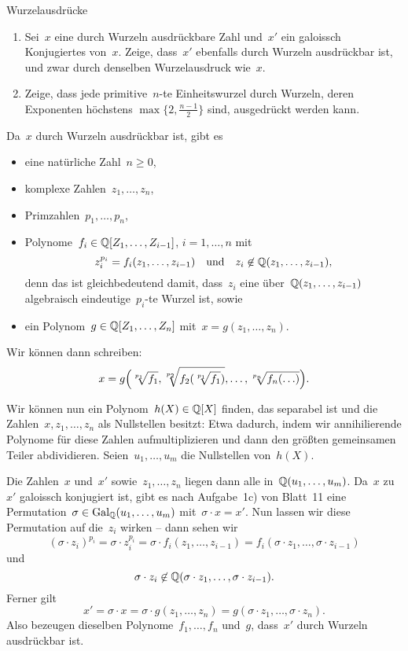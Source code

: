 \documentclass{algblatt}
\begin{document}
\begin{aufgabe}{Wurzelausdrücke}
\begin{enumerate}
\item Sei~$x$ eine durch Wurzeln ausdrückbare Zahl und~$x'$ ein galoissch
Konjugiertes von~$x$. Zeige, dass~$x'$
ebenfalls durch Wurzeln ausdrückbar ist, und zwar durch
denselben Wurzelausdruck wie~$x$.
\item Zeige, dass jede primitive~$n$-te Einheitswurzel durch Wurzeln, deren
Exponenten höchstens $\max\{ 2, \frac{n-1}{2}
\}$ sind, ausgedrückt werden kann.
\end{enumerate}

\begin{loesungE}
\item Da~$x$ durch Wurzeln ausdrückbar ist, gibt es
\begin{itemize}
\item eine natürliche Zahl~$n \geq 0$,
\item komplexe Zahlen~$z_1,\ldots,z_n$,
\item Primzahlen~$p_1,\ldots,p_n$,
\item Polynome~$f_i \in \mathbb{Q}[Z_1,\ldots,Z_{i-1}]$, $i = 1,\ldots,n$ mit
\[ z_i^{p_i} = f_i(z_1,\ldots,z_{i-1}) \quad\text{und}\quad
  z_i \not\in \mathbb{Q}(z_1,\ldots,z_{i-1}), \]
denn das ist gleichbedeutend damit,
dass~$z_i$ eine über~$\mathbb{Q}(z_1,\ldots,z_{i-1})$ algebraisch eindeutige~$p_i$-te
Wurzel ist, sowie
\item ein Polynom~$g \in \mathbb{Q}[Z_1,\ldots,Z_n]$ mit~$x = g(z_1,\ldots,z_n)$.
\end{itemize}
Wir können dann schreiben:
\[ x = g\Bigl(\sqrt[p_1]{f_1}, \sqrt[p_2]{f_2(\sqrt[p_1]{f_1})}, \ldots,
  \sqrt[p_n]{f_n(\ldots)}\Bigr). \]

Wir können nun ein Polynom~$h(X) \in \mathbb{Q}[X]$ finden, das separabel ist und die
Zahlen~$x, z_1, \ldots, z_n$ als Nullstellen besitzt: Etwa dadurch, indem wir
annihilierende Polynome für diese Zahlen aufmultiplizieren und dann den größten
gemeinsamen Teiler abdividieren. Seien~$u_1,\ldots,u_m$ die Nullstellen
von~$h(X)$.

Die Zahlen~$x$ und~$x'$ sowie~$z_1,\ldots,z_n$ liegen dann alle
in~$\mathbb{Q}(u_1,\ldots,u_m)$. Da~$x$ zu~$x'$ galoissch konjugiert ist, gibt es nach
Aufgabe~1c) von Blatt~11 eine Permutation~$\sigma \in \mathrm{Gal}_{\mathbb{Q}}(u_1,\ldots,u_m)$
mit~$\sigma \cdot x = x'$. Nun lassen wir diese Permutation auf die~$z_i$
wirken -- dann sehen wir
\[ (\sigma \cdot z_i)^{p_i} = \sigma \cdot z_i^{p_i} =
  \sigma \cdot f_i(z_1,\ldots,z_{i-1}) =
  f_i(\sigma \cdot z_1,\ldots,\sigma \cdot z_{i-1}) \]
und
\[ \sigma \cdot z_i \not\in \mathbb{Q}(\sigma \cdot z_1,\ldots,\sigma \cdot z_{i-1}).
\]
Ferner gilt
\[ x' = \sigma \cdot x = \sigma \cdot g(z_1,\ldots,z_n) =
  g(\sigma \cdot z_1,\ldots,\sigma \cdot z_n). \]
Also bezeugen dieselben Polynome~$f_1,\ldots,f_n$ und~$g$, dass~$x'$ durch
Wurzeln ausdrückbar ist.


\end{loesungE}
\end{aufgabe}
\end{document}
